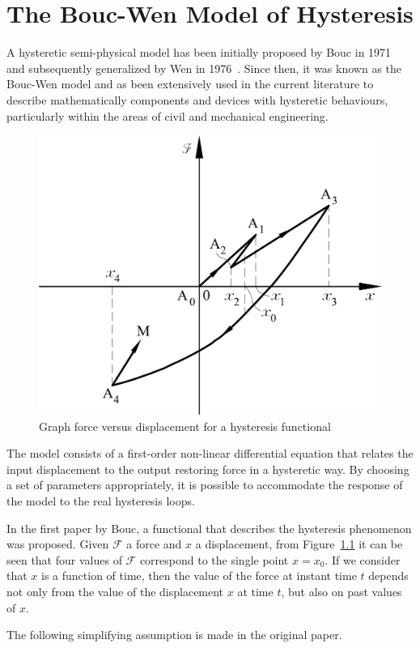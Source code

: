 \chapter{The Bouc-Wen Model of Hysteresis}
\label{app:bouc-wen}

A hysteretic semi-physical model has been initially proposed by Bouc
in 1971~\cite{bouc} and subsequently generalized by Wen in 1976~\cite{bouc_wen}.
Since then, it was known as the Bouc-Wen model and 
as been extensively used in the current literature to describe
mathematically components and devices with hysteretic behaviours,
particularly within the areas of civil and mechanical engineering.


\begin{figure}
	\centering
	\includegraphics[width=.6\textwidth]{Images/functional}
	\caption{Graph force versus displacement for a hysteresis functional}
	\label{fig:functional}
\end{figure}

The model consists of a first-order non-linear differential equation
that relates the input displacement to the output restoring
force in a hysteretic way. By choosing a set of parameters
appropriately, it is possible to accommodate the response of
the model to the real hysteresis loops.

In the first paper by Bouc, a functional that describes
the hysteresis phenomenon was proposed. Given $\mathcal{F}$ a force
and $x$ a displacement, from Figure~\ref{fig:functional}
it can be seen that four values of $\mathcal{F}$ correspond
to the single point $x = x_0$. If we consider that $x$ is a function of time,
then the value of the force at instant time $t$ depends not only
from the value of the displacement $x$ at time $t$, but also on past values of $x$.

The following simplifying assumption is made in the original paper.

